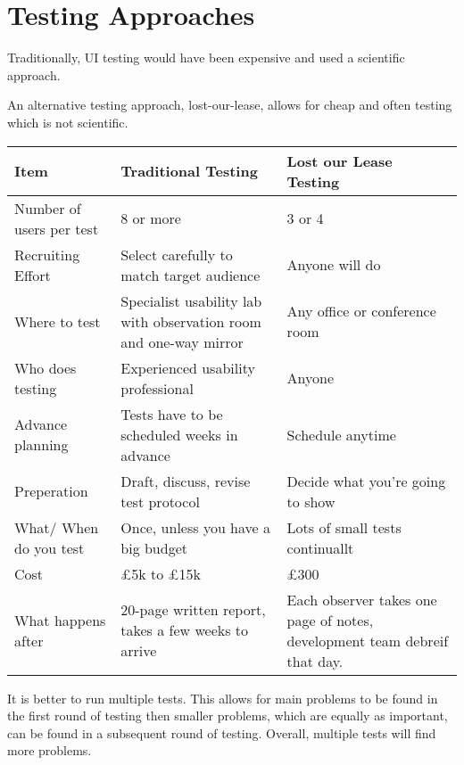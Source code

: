 \section{Testing Approaches}
Traditionally, UI testing would have been expensive and used a scientific approach. 

An alternative testing approach, lost-our-lease, allows for cheap and often testing which is not scientific.

\begin{table}[H]
    \centering
    \begin{tabular}{p{} p{} p{}}
        \textbf{Item} & \textbf{Traditional Testing} & \textbf{Lost our Lease Testing}\\
        \hline
        \hline
        Number of users per test & 8 or more & 3 or 4\\
        \hline
        Recruiting Effort & Select carefully to match target audience & Anyone will do\\
        \hline
        Where to test & Specialist usability lab with observation room and one-way mirror & Any office or conference room\\
        \hline
        Who does testing & Experienced usability professional & Anyone\\
        \hline
        Advance planning & Tests have to be scheduled weeks in advance & Schedule anytime\\
        \hline
        Preperation & Draft, discuss, revise test protocol & Decide what you're going to show \\
        \hline
        What/ When do you test & Once, unless you have a big budget & Lots of small tests continuallt\\
        \hline
        Cost & £5k to £15k & £300\\
        \hline
        What happens after  & 20-page written report, takes a few weeks to arrive & Each observer takes one page of notes, development team debreif that day.\\
        \hline
        
    \end{tabular}
\end{table}

It is better to run multiple tests. This allows for main problems to be found in the first round of testing then smaller problems, which are equally as important, can be found in a subsequent round of testing. Overall, multiple tests will find more problems. 


